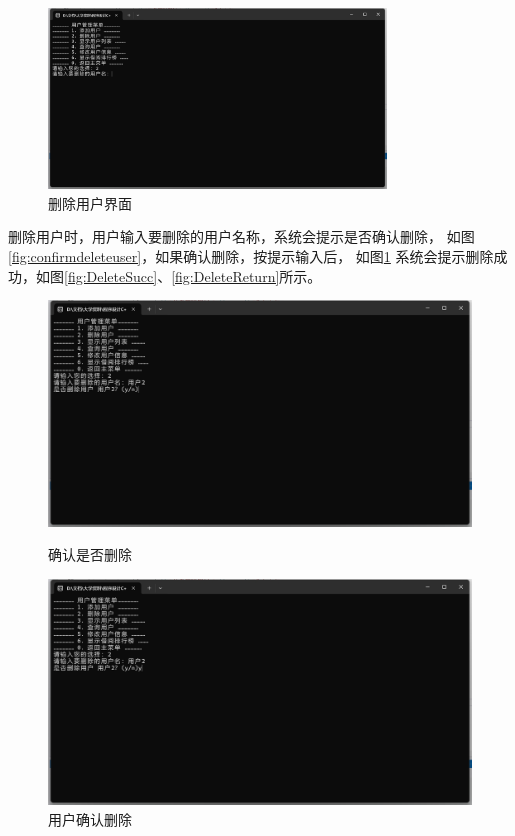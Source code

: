 \documentclass[12pt,twoside]{ctexart}
\begin{document}
\begin{figure}[H]
    \centering
    \includegraphics[width=0.8\textwidth]{DeleteUser.png}
    \caption{删除用户界面}
\end{figure}

删除用户时，用户输入要删除的用户名称，系统会提示是否确认删除，
如图\ref{fig:confirmdeleteuser}，如果确认删除，按提示输入后，
如图\ref{fig:Deleteuserconfirm}
系统会提示删除成功，如图\ref{fig:DeleteSucc}、\ref{fig:DeleteReturn}所示。
\begin{figure}[H]
    \centering
    \begin{minipage}{0.48\textwidth}
        \centering
        \includegraphics[width=\linewidth]{confirmdeleteuser.png}
        \caption{确认是否删除}
        \label{fig:confirmdeleteuser}
    \end{minipage}\hfill
    \begin{minipage}{0.48\textwidth}
        \centering
        \includegraphics[width=\linewidth]{Deleteuserconfirm.png}
        \caption{用户确认删除}
        \label{fig:Deleteuserconfirm}
    \end{minipage}
\end{figure}
\end{document}

